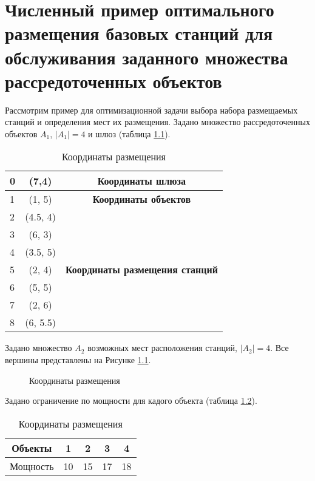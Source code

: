 \chapter{Численный пример оптимального размещения базовых станций для обслуживания заданного множества рассредоточенных объектов}\label{app:milp_place_solution}
Рассмотрим пример для оптимизационной задачи выбора набора размещаемых станций и определения мест их размещения.
Задано множество рассредоточенных объектов $A_1$, $|A_1| = 4$ и шлюз (таблица \cref{tab:part2_placement_coordinates}).

\begin{table}
    \centering
    \captionsetup{justification=centering} %
    \caption{Координаты размещения}\label{tab:part2_placement_coordinates}
    \begin{tabular}{|l|c|c|}
        \toprule
        0   & (7,4) & \textbf{Координаты шлюза} \\
        \midrule
        1   & (1, 5)& \textbf{Координаты объектов}  \\
        2   & (4.5, 4) & \\
        3   & (6, 3) & \\
        4   & (3.5, 5) & \\
        \midrule
        5   & (2, 4) & \textbf{Координаты размещения станций}  \\
        6   & (5, 5) & \\
        7   & (2, 6) & \\
        8   & (6, 5.5) & \\
        \bottomrule
    \end{tabular}
\end{table}

Задано множество $A_2$ возможных мест расположения станций, $|A_2| = 4$. Все вершины представлены на Рисунке \ref{fig:part2_coordinates}.
 
\begin{figure}[ht]
    \caption{Координаты размещения}\label{fig:part2_coordinates}
\end{figure}

Задано ограничение по мощности для кадого объекта (таблица \ref{tab:part2_object_capacity}).

\begin{table}
    \centering
    \captionsetup{justification=centering} %
    \caption{Координаты размещения}\label{tab:part2_object_capacity}
    \begin{tabular}{|c|cccc|}
        \toprule
        Объекты   & 1 & 2 & 3 & 4 \\
        \midrule
        Мощность  & 10 & 15 & 17 & 18 \\
        \bottomrule
    \end{tabular}
\end{table}

